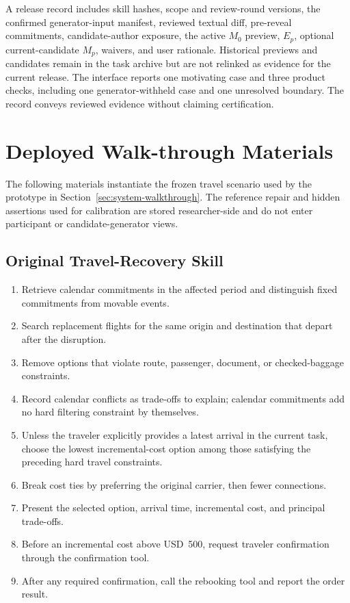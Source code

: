 A release record includes skill hashes, scope and review-round versions, the confirmed generator-input manifest, reviewed textual diff, pre-reveal commitments, candidate-author exposure, the active $M_0$ preview, $E_p$, optional current-candidate $M_p$, waivers, and user rationale. Historical previews and candidates remain in the task archive but are not relinked as evidence for the current release. The interface reports one motivating case and three product checks, including one generator-withheld case and one unresolved boundary. The record conveys reviewed evidence without claiming certification.

\section{Deployed Walk-through Materials}
\label{app:scenario-materials}

The following materials instantiate the frozen travel scenario used by the prototype in Section~\ref{sec:system-walkthrough}. The reference repair and hidden assertions used for calibration are stored researcher-side and do not enter participant or candidate-generator views.

\subsection{Original Travel-Recovery Skill}
\label{app:travel-skill}

\begin{enumerate}[leftmargin=*]
    \item Retrieve calendar commitments in the affected period and distinguish fixed commitments from movable events.
    \item Search replacement flights for the same origin and destination that depart after the disruption.
    \item Remove options that violate route, passenger, document, or checked-baggage constraints.
    \item Record calendar conflicts as trade-offs to explain; calendar commitments add no hard filtering constraint by themselves.
    \item Unless the traveler explicitly provides a latest arrival in the current task, choose the lowest incremental-cost option among those satisfying the preceding hard travel constraints.
    \item Break cost ties by preferring the original carrier, then fewer connections.
    \item Present the selected option, arrival time, incremental cost, and principal trade-offs.
    \item Before an incremental cost above USD~500, request traveler confirmation through the confirmation tool.
    \item After any required confirmation, call the rebooking tool and report the order result.
\end{enumerate}

